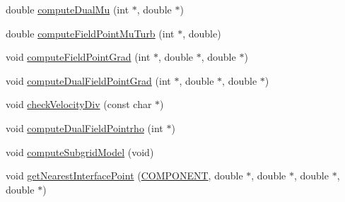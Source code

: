 \begin{DoxyCompactItemize}
\item 
double \hyperlink{class_incompress___solver___smooth___basis_ae3cc9803061614b52d8cb9a25a2ad07c}{compute\+Dual\+Mu} (int $\ast$, double $\ast$)
\item 
double \hyperlink{class_incompress___solver___smooth___basis_a02412b6e6f60df2082488b1f59c400ba}{compute\+Field\+Point\+Mu\+Turb} (int $\ast$, double)
\item 
void \hyperlink{class_incompress___solver___smooth___basis_ac4818d2491e81112d5923f96f4971f5a}{compute\+Field\+Point\+Grad} (int $\ast$, double $\ast$, double $\ast$)
\item 
void \hyperlink{class_incompress___solver___smooth___basis_a0aa9ce8a7e58b5acaf4cfddd381ae1ad}{compute\+Dual\+Field\+Point\+Grad} (int $\ast$, double $\ast$, double $\ast$)
\item 
void \hyperlink{class_incompress___solver___smooth___basis_aadc3be8fbe71622ac8835cd9efa13201}{check\+Velocity\+Div} (const char $\ast$)
\item 
void \hyperlink{class_incompress___solver___smooth___basis_ab3a2da1806310a445654797d5443a369}{compute\+Dual\+Field\+Pointrho} (int $\ast$)
\item 
void \hyperlink{class_incompress___solver___smooth___basis_a854f0af5d09a6268a3a62ba93c035194}{compute\+Subgrid\+Model} (void)
\item 
void \hyperlink{class_incompress___solver___smooth___basis_ab2d41c73fbfdcade10cdabae9a0b35c5}{get\+Nearest\+Interface\+Point} (\hyperlink{int_8h_a2bb7be12ca59ea6443c8757df0a7c278}{C\+O\+M\+P\+O\+N\+E\+NT}, double $\ast$, double $\ast$, double $\ast$, double $\ast$)
\end{DoxyCompactItemize}

